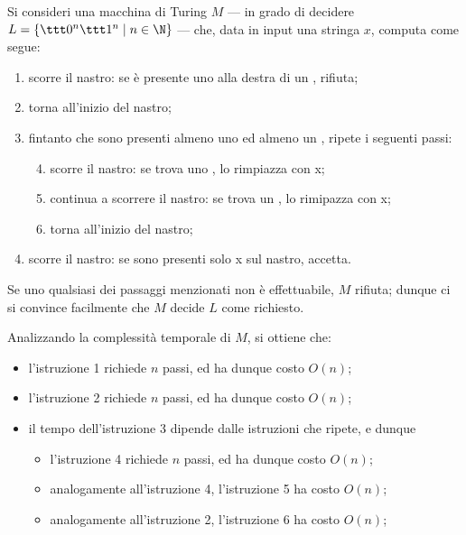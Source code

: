 \documentclass[a4paper, 12pt]{report}
\begin{document}
    \begin{example}
        Si consideri una macchina di Turing $M$ --- in grado di decidere $L= \{\ttt 0 ^n \ttt 1 ^n \mid n \in \N\}$ --- che, data in input una stringa $x$, computa come segue: 

        \begin{enumerate}
            \item scorre il nastro: se è presente uno  alla destra di un , rifiuta;
            \item torna all'inizio del nastro;
            \item fintanto che sono presenti almeno uno  ed almeno un , ripete i seguenti passi:
                \begin{enumerate}[label=\arabic*.]
                    \setcounter{enumii}{3}
                    \setcounter{enumi}{6}
                    \item scorre il nastro: se trova uno , lo rimpiazza con \ttt x;
                    \item continua a scorrere il nastro: se trova un , lo rimipazza con \ttt x;
                    \item torna all'inizio del nastro;
                \end{enumerate}
            \item scorre il nastro: se sono presenti solo \ttt x sul nastro, accetta.
        \end{enumerate}

        Se uno qualsiasi dei passaggi menzionati non è effettuabile, $M$ rifiuta; dunque ci si convince facilmente che $M$ decide $L$ come richiesto.

        Analizzando la complessità temporale di $M$, si ottiene che:

        \begin{itemize}
            \item l'istruzione 1 richiede $n$ passi, ed ha dunque costo $O(n)$;
            \item l'istruzione 2 richiede $n$ passi, ed ha dunque costo $O(n)$;
            \item il tempo dell'istruzione 3 dipende dalle istruzioni che ripete, e dunque

                \begin{itemize}
                    \item l'istruzione 4 richiede $n$ passi, ed ha dunque costo $O(n)$;
                    \item analogamente all'istruzione 4, l'istruzione 5 ha costo $O(n)$;
                    \item analogamente all'istruzione 2, l'istruzione 6 ha costo $O(n)$;
                \end{itemize}


\end{itemize}
\end{example}
\end{document}
